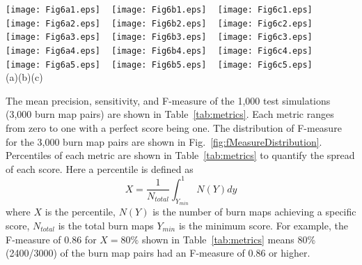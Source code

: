 \documentclass[smallcondensed]{svjour3}     %
\begin{document}
\begin{figure*}[htbp]
  \centering
	\texttt{[image: Fig6a1.eps]}
	~
	\texttt{[image: Fig6b1.eps]}
	~
	\texttt{[image: Fig6c1.eps]}
	\\
	\texttt{[image: Fig6a2.eps]}
	~
	\texttt{[image: Fig6b2.eps]}
	~
	\texttt{[image: Fig6c2.eps]}
	\\
	\texttt{[image: Fig6a3.eps]}
	~
	\texttt{[image: Fig6b3.eps]}
	~
	\texttt{[image: Fig6c3.eps]}
	\\
	\texttt{[image: Fig6a4.eps]}
	~
	\texttt{[image: Fig6b4.eps]}
	~
	\texttt{[image: Fig6c4.eps]}
	\\
	\texttt{[image: Fig6a5.eps]}
	~
	\texttt{[image: Fig6b5.eps]}
	~
	\texttt{[image: Fig6c5.eps]}
	\\
\hspace{0.033\textwidth}(a)\hspace{0.29\textwidth}(b)\hspace{0.34\textwidth}(c)
\caption{Example CNN prediction results (a) Simulation burn maps (b) CNN predicted burn map (c) Classification error}
\label{fig:exampleNetwork}       %
\end{figure*}

The mean precision, sensitivity, and F-measure of the 1,000 test
simulations (3,000 burn map pairs) are shown in Table~\ref{tab:metrics}.
Each metric ranges from zero to one with a perfect score being one. 
The distribution of F-measure for the 3,000 burn map pairs are shown
in Fig.~\ref{fig:fMeasureDistribution}.
Percentiles of each metric are shown in Table~\ref{tab:metrics} to
quantify the spread of each score. Here a percentile is defined as
\begin{equation}
X = \frac{1}{N_{total}}\int_{Y_{min}}^{1}N(Y)dy
\label{eq:percentile}
\end{equation}
where $X$ is the percentile, $N(Y)$ is the number of burn maps achieving
a specific score, $N_{total}$ is the total burn maps $Y_{min}$ is the minimum
score. For example, the F-measure of 0.86 for $X=80\%$ shown in
Table~\ref{tab:metrics} means 80\% (2400/3000) of the burn map pairs
had an F-measure of 0.86 or higher.
\end{document}
